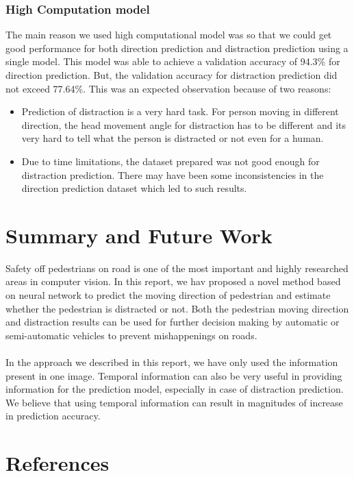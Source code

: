 \documentclass[extendedabs]{bmvc2k}
\begin{document}
\subsubsection{High Computation model}
The main reason we used high computational model was so that we could get good performance for both direction prediction and distraction prediction using a single model. This model was able to achieve a validation accuracy of 94.3\% for direction prediction. But, the validation accuracy for distraction prediction did not exceed 77.64\%. This was an expected observation because of two reasons:
\begin{itemize}
    \item Prediction of distraction is a very hard task. For person moving in different direction, the head movement angle for distraction has to be different and its very hard to tell what the person is distracted or not even for a human.
    \item Due to time limitations, the dataset prepared was not good enough for distraction prediction. There may have been some inconsistencies in the direction prediction dataset which led to such results.
\end{itemize}

\section{Summary and Future Work}
Safety off pedestrians on road is one of the most important and highly researched areas in computer vision. In this report, we hav proposed a novel method based on neural network to predict the moving direction of pedestrian and estimate whether the pedestrian is distracted or not. Both the pedestrian moving direction and distraction results can be used for further decision making by automatic or semi-automatic vehicles to prevent mishappenings on roads.\\\\
In the approach we described in this report, we have only used the information present in one image. Temporal information can also be very useful in providing information for the prediction model, especially in case of distraction prediction. We believe that using temporal information can result in magnitudes of increase in prediction accuracy.

\section{References}

\end{document}
